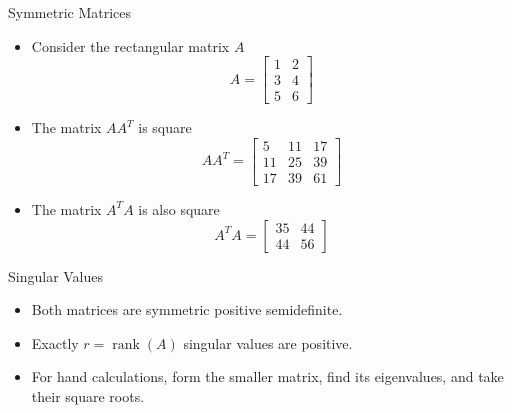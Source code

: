 \documentclass[10pt]{beamer}
\begin{document}




\begin{frame}{Symmetric Matrices}
\begin{itemize}
    \item Consider the rectangular matrix $A$
    $$
        A = \begin{bmatrix}
            1 & 2\\ 3 & 4 \\ 5 & 6
        \end{bmatrix}
    $$
    \item The matrix $AA^T$ is square  
    $$
    A A^T = \begin{bmatrix}
        5 & 11 & 17\\
        11 & 25 & 39\\
        17 & 39 & 61
    \end{bmatrix}
    $$
    \item The matrix $A^TA$ is also square 
    $$
    A^TA = \begin{bmatrix}
        35 & 44\\
        44 & 56
    \end{bmatrix}
    $$
\end{itemize}
\end{frame}

\begin{frame}{Singular Values}
\begin{itemize}
\item Both matrices are symmetric positive semidefinite.
\item Exactly $r=\operatorname{rank}(A)$ singular values are positive.
\item For hand calculations, form the smaller matrix, find its eigenvalues, and take their square roots.
\end{itemize}
\end{frame}
\end{document}

